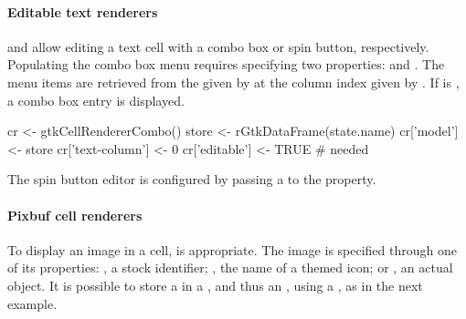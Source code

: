 \paragraph{Editable text renderers}

 and  allow
editing a text cell with a combo box or spin button,
respectively. Populating the combo box menu requires specifying two
properties:  and . The menu items are
retrieved from the  given by  at the
column index given by .  If  is
, a combo box entry is displayed.
\begin{Schunk}
\begin{Sinput}
 cr <- gtkCellRendererCombo()
 store <- rGtkDataFrame(state.name)
 cr['model'] <- store
 cr['text-column'] <- 0
 cr['editable'] <- TRUE                  # needed
\end{Sinput}
\end{Schunk}
The spin button editor is configured by passing a
 to the  property.


\paragraph{Pixbuf cell renderers}

To display an image in a cell,  is
appropriate. The image is specified through one of its properties:
, a stock identifier; , the name of a
themed icon; or , an actual 
object. It is possible to store a  in a
, and thus an , using a
, as in the next example.



